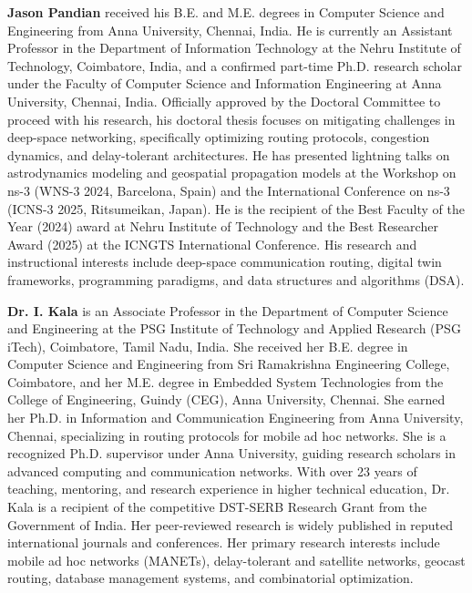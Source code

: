 \documentclass[a4paper,fleqn]{cas-sc}
\begin{document}
{\bf Jason Pandian} received his B.E. and M.E. degrees in Computer Science and Engineering from Anna University, Chennai, India. He is currently an Assistant Professor in the Department of Information Technology at the Nehru Institute of Technology, Coimbatore, India, and a confirmed part-time Ph.D. research scholar under the Faculty of Computer Science and Information Engineering at Anna University, Chennai, India. Officially approved by the Doctoral Committee to proceed with his research, his doctoral thesis focuses on mitigating challenges in deep-space networking, specifically optimizing routing protocols, congestion dynamics, and delay-tolerant architectures. He has presented lightning talks on astrodynamics modeling and geospatial propagation models at the Workshop on ns-3 (WNS-3 2024, Barcelona, Spain) and the International Conference on ns-3 (ICNS-3 2025, Ritsumeikan, Japan). He is the recipient of the Best Faculty of the Year (2024) award at Nehru Institute of Technology and the Best Researcher Award (2025) at the ICNGTS International Conference. His research and instructional interests include deep-space communication routing, digital twin frameworks, programming paradigms, and data structures and algorithms (DSA). 
\endbio

{\bf Dr. I. Kala} is an Associate Professor in the Department of Computer Science and Engineering at the PSG Institute of Technology and Applied Research (PSG iTech), Coimbatore, Tamil Nadu, India. She received her B.E. degree in Computer Science and Engineering from Sri Ramakrishna Engineering College, Coimbatore, and her M.E. degree in Embedded System Technologies from the College of Engineering, Guindy (CEG), Anna University, Chennai. She earned her Ph.D. in Information and Communication Engineering from Anna University, Chennai, specializing in routing protocols for mobile ad hoc networks. She is a recognized Ph.D. supervisor under Anna University, guiding research scholars in advanced computing and communication networks. With over 23 years of teaching, mentoring, and research experience in higher technical education, Dr. Kala is a recipient of the competitive DST-SERB Research Grant from the Government of India. Her peer-reviewed research is widely published in reputed international journals and conferences. Her primary research interests include mobile ad hoc networks (MANETs), delay-tolerant and satellite networks, geocast routing, database management systems, and combinatorial optimization.
\endbio
\end{document}
